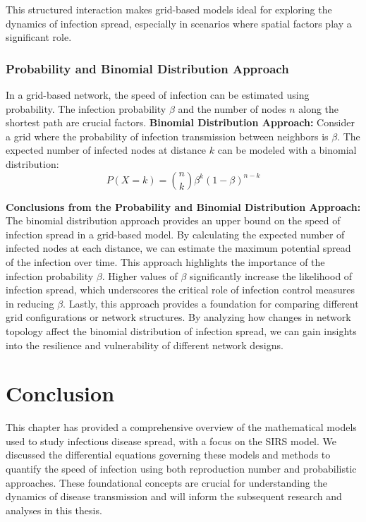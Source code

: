 \noindent
This structured interaction makes grid-based models ideal for exploring the dynamics of infection spread, especially in scenarios where spatial factors play a significant role.

\subsubsection{Probability and Binomial Distribution Approach}
In a grid-based network, the speed of infection can be estimated using probability. The infection probability $\beta$ and the number of nodes $n$ along the shortest path are crucial factors.
\noindent
\textbf{Binomial Distribution Approach:}
Consider a grid where the probability of infection transmission between neighbors is $\beta$. The expected number of infected nodes at distance $k$ can be modeled with a binomial distribution:
\begin{equation}
P(X = k) = \binom{n}{k} \beta^k (1 - \beta)^{n-k}
\end{equation}

\noindent
\textbf{Conclusions from the Probability and Binomial Distribution Approach:}
The binomial distribution approach provides an upper bound on the speed of infection spread in a grid-based model. By calculating the expected number of infected nodes at each distance, we can estimate the maximum potential spread of the infection over time. This approach highlights the importance of the infection probability $\beta$. Higher values of $\beta$ significantly increase the likelihood of infection spread, which underscores the critical role of infection control measures in reducing $\beta$. Lastly, this approach provides a foundation for comparing different grid configurations or network structures. By analyzing how changes in network topology affect the binomial distribution of infection spread, we can gain insights into the resilience and vulnerability of different network designs.

\section{Conclusion}
This chapter has provided a comprehensive overview of the mathematical models used to study infectious disease spread, with a focus on the SIRS model. We discussed the differential equations governing these models and methods to quantify the speed of infection using both reproduction number and probabilistic approaches. These foundational concepts are crucial for understanding the dynamics of disease transmission and will inform the subsequent research and analyses in this thesis.